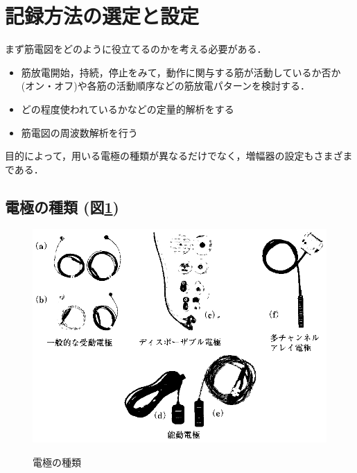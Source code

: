 \documentclass[10pt,twocolumn]{jarticle}
\begin{document}


\section{記録方法の選定と設定}

まず筋電図をどのように役立てるのかを考える必要がある．
\begin{itemize}
\item 筋放電開始，持続，停止をみて，動作に関与する筋が活動しているか否か (オン・オフ)や各筋の活動順序などの筋放電パターンを検討する．
\item どの程度使われているかなどの定量的解析をする
\item 筋電図の周波数解析を行う
\end{itemize}
目的によって，用いる電極の種類が異なるだけでなく，増幅器の設定もさまざまである．

\subsection{電極の種類 (図\ref{fig:fig6})}

\begin{figure}
\begin{center}
{
   \scalebox{0.8}
   {
      \includegraphics{emg005.eps}
   }
}
\caption{電極の種類}
\label{fig:fig6}
\end{center}
\end{figure}
\end{document}
